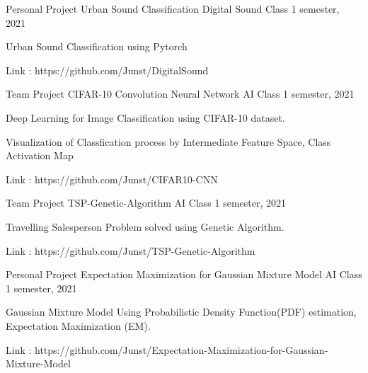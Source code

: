 \begin{cventries}
  \cventry
    {Personal Project} %
    {Urban Sound Classification} %
    {Digital Sound Class} %
    {1 semester, 2021} %
    {
      \begin{cvitems} %
        \item {Urban Sound Classification using Pytorch}
        \item {Link : https://github.com/Junst/DigitalSound }
      \end{cvitems}
    }
    
  \cventry
    {Team Project} %
    {CIFAR-10 Convolution Neural Network} %
    {AI Class} %
    {1 semester, 2021} %
    {
      \begin{cvitems} %
        \item {Deep Learning for Image Classification using CIFAR-10 dataset.}
        \item {Visualization of Classfication process by Intermediate Feature Space, Class Activation Map}
        \item {Link : https://github.com/Junst/CIFAR10-CNN }
      \end{cvitems}
    }
    
  \cventry
    {Team Project} %
    {TSP-Genetic-Algorithm} %
    {AI Class} %
    {1 semester, 2021} %
    {
      \begin{cvitems} %
        \item {Travelling Salesperson Problem solved using Genetic Algorithm.}
        \item {Link : https://github.com/Junst/TSP-Genetic-Algorithm }
      \end{cvitems}
    }
    
  \cventry
    {Personal Project} %
    {Expectation Maximization for Gaussian Mixture Model} %
    {AI Class} %
    {1 semester, 2021} %
    {
      \begin{cvitems} %
        \item {Gaussian Mixture Model Using Probabilistic Density Function(PDF) estimation, Expectation Maximization (EM).}
        \item {Link : https://github.com/Junst/Expectation-Maximization-for-Gaussian-Mixture-Model }
      \end{cvitems}
    }
        
\end{cventries}
